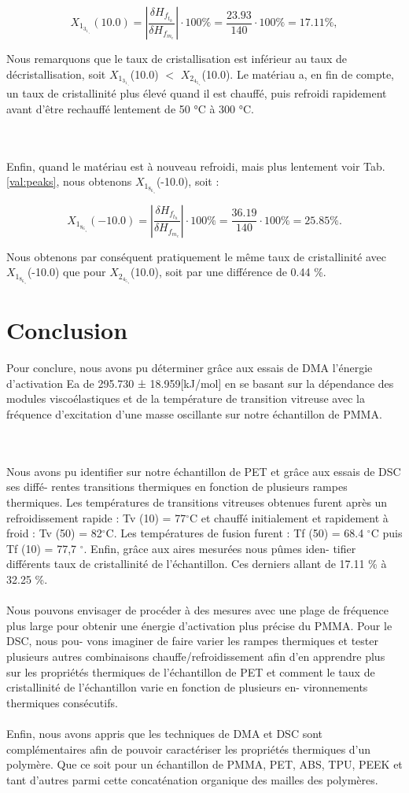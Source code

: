 \[
	X_1_3_1_._1(10.0) = |\frac{\delta H_f_t_h}{\delta H_f_m_e}| \cdot 100\% = \frac{23.93}{140} \cdot 100\% = 17.11 \%,
\]

Nous remarquons que le taux de cristallisation est inférieur au taux de décristallisation, soit $X_1_3_1_._1$(10.0) $<$ $X_2_4_5_._9$(10.0). Le matériau a, en fin de compte, un taux de cristallinité plus élevé quand il est chauffé, puis refroidi rapidement avant d’être rechauffé lentement de 50 °C à 300 °C.

\\\\
Enfin, quand le matériau est à nouveau refroidi, mais plus lentement voir Tab. \ref{val:peaks}, nous obtenons $X_1_8_6_._8$(-10.0), soit : 

\[
        X_1_8_6_._8(-10.0) = |\frac{\delta H_f_t_h}{\delta H_f_m_e}| \cdot 100\% = \frac{36.19}{140} \cdot 100\% = 25.85 \%.
\]

Nous obtenons par conséquent pratiquement le même taux de cristallinité avec $X_1_8_6_._8$(-10.0) que pour $X_2_4_5_._9$(10.0), soit par une différence de 0.44 \%.

\section{Conclusion}
Pour conclure, nous avons pu déterminer grâce aux essais de DMA l’énergie d’activation Ea
de 295.730 ± 18.959[kJ/mol] en se basant sur la dépendance des modules viscoélastiques et
de la température de transition vitreuse avec la fréquence d’excitation d’une masse oscillante
sur notre échantillon de PMMA.

\\\\
Nous avons pu identifier sur notre échantillon de PET et grâce aux essais de DSC ses diffé-
rentes transitions thermiques en fonction de plusieurs rampes thermiques. Les températures
de transitions vitreuses obtenues furent après un refroidissement rapide : Tv (10) = 77$^\circ$C
et chauffé initialement et rapidement à froid : Tv (50) = 82$^\circ$C. Les températures de fusion
furent : Tf (50) = 68.4 $^\circ$C puis Tf (10) = 77,7 $^\circ$. Enfin, grâce aux aires mesurées nous pûmes iden-
tifier différents taux de cristallinité de l’échantillon. Ces derniers allant de 17.11 \% à 32.25 \%.
\\\\
Nous pouvons envisager de procéder à des mesures avec une plage de fréquence plus large
pour obtenir une énergie d’activation plus précise du PMMA. Pour le DSC, nous pou-
vons imaginer de faire varier les rampes thermiques et tester plusieurs autres combinaisons
chauffe/refroidissement afin d’en apprendre plus sur les propriétés thermiques de l’échantillon
de PET et comment le taux de cristallinité de l’échantillon varie en fonction de plusieurs en-
vironnements thermiques consécutifs.
\\\\
Enfin, nous avons appris que les techniques de DMA et DSC sont complémentaires afin de
pouvoir caractériser les propriétés thermiques d’un polymère. Que ce soit pour un échantillon
de PMMA, PET, ABS, TPU, PEEK et tant d’autres parmi cette concaténation organique
des mailles des polymères.

